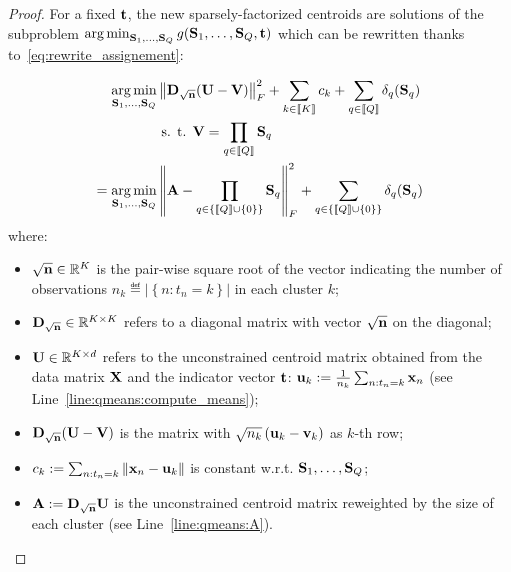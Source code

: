 \begin{proof}

For a fixed ${\mathbf{t}}$, the new sparsely-factorized centroids are solutions of the subproblem $\operatorname*{arg\,min}_{{\mathbf{S}}_1, \ldots,{\mathbf{S}}_Q} g({\mathbf{S}}_1, \ldots,{\mathbf{S}}_Q, {\mathbf{t}})$ which can be rewritten thanks to~\eqref{eq:rewrite_assignement}:
%



\begin{align}
 \operatorname*{arg\,min}_{{\mathbf{S}}_1, \ldots,{\mathbf{S}}_Q} & \left \| {\mathbf{D}}_{\sqrt{{\mathbf{n}}}} ({\mathbf{U}} - {\mathbf{V}})\right \|_F^2 + \sum_{k\in\left \llbracket K\right \rrbracket} c_k + \sum_{q\in\left \llbracket Q\right \rrbracket} \delta_q({\mathbf{S}}_q) \notag \\
 & \text{ s. t. } {\mathbf{V}} = \prod_{q\in\left \llbracket Q\right \rrbracket}{{\mathbf{S}}_q} \nonumber\\
 = \operatorname*{arg\,min}_{{\mathbf{S}}_1, \ldots,{\mathbf{S}}_Q} & \left \| {\mathbf{A}} - \prod_{q\in\left\{\left \llbracket Q\right \rrbracket \cup \{0\}\right\}}{{\mathbf{S}}_q}\right \|_F^2 + \sum_{q\in\left\{\left \llbracket Q\right \rrbracket \cup \{0\}\right\}} \delta_q({\mathbf{S}}_q) \notag \\
 \label{eq:qmeans_problem_t_fixed}
 \end{align}
%
where:
%
\begin{itemize}
 \item $\sqrt{{\mathbf{n}}} \in \mathbb{R}^{K}$ is the pair-wise square root of the vector indicating the number of observations $n_k \eqdef \left | \left \lbrace n: t_n = k\right \rbrace \right |$  in each cluster $k$;
 \item ${\mathbf{D}}_{\sqrt{{\mathbf{n}}}} \in \mathbb{R}^{K \times K}$ refers to a diagonal matrix with vector $\sqrt{{\mathbf{n}}}$ on the diagonal;
 \item ${\mathbf{U}}\in \mathbb{R}^{K \times d}$ refers to the unconstrained centroid matrix obtained from the data matrix ${\mathbf{X}}$ and the indicator vector ${\mathbf{t}}$: ${\mathbf{u}}_k := \frac{1}{n_k}\sum_{n:t_n = k} {{\mathbf{x}}_n}$ (see Line~\ref{line:qmeans:compute_means});
 \item ${\mathbf{D}}_{\sqrt{{\mathbf{n}}}} ({\mathbf{U}} - {\mathbf{V}})$ is the matrix with $\sqrt{n_k}\left ({\mathbf{u}}_k-{\mathbf{v}}_k\right )$ as $k$-th row;
 \item $c_k := \sum_{n: t_n = k}\left \| {\mathbf{x}}_n - {\mathbf{u}}_k\right \|$ is constant w.r.t. $ {\mathbf{S}}_1, \ldots,{\mathbf{S}}_Q$;
 \item ${\mathbf{A}} := {\mathbf{D}}_{\sqrt{{\mathbf{n}}}} {\mathbf{U}}$ is the unconstrained centroid matrix reweighted by the size of each cluster (see Line~\ref{line:qmeans:A}).
\end{itemize}


\end{proof}
